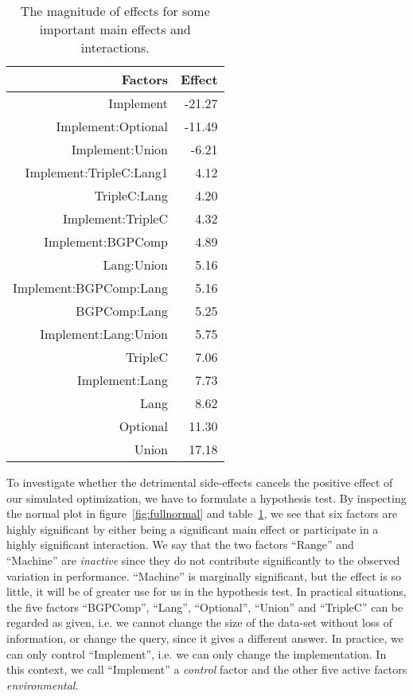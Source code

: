 \documentclass{llncs}
\begin{document}
\begin{table}[hb]
\begin{center}
\caption{The magnitude of effects for some important main effects and interactions.}\label{tab:effects}
\begin{tabular}{rr}
  \hline
Factors & Effect  \\ 
  \hline
Implement & -21.27 \\ 
  Implement:Optional & -11.49 \\ 
  Implement:Union & -6.21 \\ 
  Implement:TripleC:Lang1 & 4.12 \\ 
  TripleC:Lang & 4.20 \\ 
  Implement:TripleC & 4.32 \\ 
  Implement:BGPComp & 4.89 \\ 
  Lang:Union & 5.16 \\ 
  Implement:BGPComp:Lang & 5.16 \\ 
  BGPComp:Lang & 5.25 \\ 
  Implement:Lang:Union & 5.75 \\ 
  TripleC & 7.06 \\ 
  Implement:Lang & 7.73 \\ 
  Lang & 8.62 \\ 
  Optional & 11.30 \\ 
  Union & 17.18 \\ 
   \hline
\end{tabular}
\end{center}
\end{table}


To investigate whether the detrimental side-effects cancels the
positive effect of our simulated optimization, we have to formulate a
hypothesis test. By inspecting the normal plot in
figure~\ref{fig:fullnormal} and table~\ref{tab:effects}, we see that
six factors are highly significant by either being a significant main
effect or participate in a highly significant interaction. We say that
the two factors ``Range'' and ``Machine'' are \emph{inactive} since
they do not contribute significantly to the observed variation in
performance. ``Machine'' is marginally significant, but the effect is
so little, it will be of greater use for us in the hypothesis test. In
practical situations, the five factors ``BGPComp'', ``Lang'',
``Optional'', ``Union'' and ``TripleC'' can be regarded as given,
i.e. we cannot change the size of the data-set without loss of
information, or change the query, since it gives a different
answer. In practice, we can only control ``Implement'', i.e. we can
only change the implementation. In this context, we call ``Implement''
a \emph{control} factor and the other five active factors
\emph{environmental}.
\end{document}
